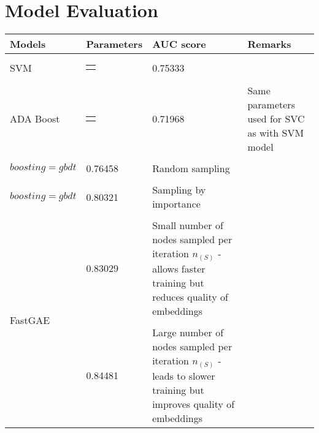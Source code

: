 \documentclass[11pt, oneside]{article}
\begin{document}
\section{Model Evaluation}
\vspace{-10pt}
\begin{table}
\centering
\begin{tiny}
\begin{tabularx}{\textwidth}{p{3cm} p{5cm} p{2cm} p{6.5cm}}
\toprule
\textbf{Models} & \textbf{Parameters} & \textbf{AUC score} & \textbf{Remarks} \\
\midrule
 SVM & \begin{tabular}{@{}l @{}} $C = 10$ $Kernel = Linear$ \end{tabular}  & 0.75333 & \\ 
\midrule
 ADA Boost & \begin{tabular}{@{}l @{}} $Estimator = SVC $\end{tabular} & 0.71968 & Same parameters used for SVC as with SVM model\\
 \addlinespace[0.2cm]
  \multirow{4}{*}{LightGBM}  & \begin{tabular}{@{}l @{}} $sampling = random$, $objective = binary$ \\ $boosting = gbdt$ \end{tabular} & 0.76458 & Random sampling \\  
  \addlinespace[0.2cm]
  & \begin{tabular}{@{}l @{}} $sampling = importance$, $objective = binary$ \\ $boosting = gbdt$ \end{tabular} & 0.80321 & Sampling by importance \\  
 \midrule
 \multirow{7}{*}{FastGAE} &  \begin{tabular}{@{}l @{}} $\eta = 0.01$, $\alpha = 1$, $n_{(S)}=1,000$ \\  $n_{iter}=200$, $d_{embedding}=16$ \end{tabular} & 0.83029 & Small number of nodes sampled per iteration $n_{(S)}$ - allows faster training but reduces quality of embeddings \\
\addlinespace[0.2cm]
  & \begin{tabular}{@{}l @{}} $\eta = 0.01$, $\alpha = 2$, $n_{(S)}=10,000$ \\ $n_{iter}=200$, $d_{embedding}=16$ \end{tabular} & 0.84481 & Large number of nodes sampled per iteration $n_{(S)}$ - leads to slower training but improves quality of embeddings \\

\end{tabularx}
\end{tiny}
\end{table}
\end{document}
